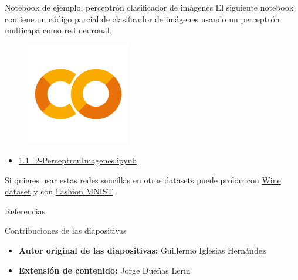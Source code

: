 \begin{frame}{Notebook de ejemplo, perceptrón clasificador de imágenes}
El siguiente notebook contiene un código parcial de clasificador de imágenes usando un perceptrón multicapa como red neuronal.

\begin{figure}
    \centering
    \includegraphics[width=0.4\textwidth]{Slides/figures/GoogleColab.png}
\end{figure}
\begin{itemize}
    \centering
    \item {\Large \href{https://colab.research.google.com/github/guillermoih/M-todos-Generativos/blob/main/Notebooks/1.1_02-PerceptronImagenes.ipynb}{1.1\_2-PerceptronImagenes.ipynb}}
\end{itemize}
Si quieres usar estas redes sencillas en otros datasets puede probar con \href{https://archive.ics.uci.edu/dataset/109/wine}{Wine dataset} y con \href{https://github.com/zalandoresearch/fashion-mnist}{Fashion MNIST}.
\end{frame}

\begin{frame}[allowframebreaks]{Referencias}
    
    
\end{frame}

\begin{frame}{Contribuciones de las diapositivas}
\begin{itemize}
    \item \textbf{Autor original de las diapositivas:} Guillermo Iglesias Hernández
    \item \textbf{Extensión de contenido:} Jorge Dueñas Lerín
\end{itemize}
\end{frame}

